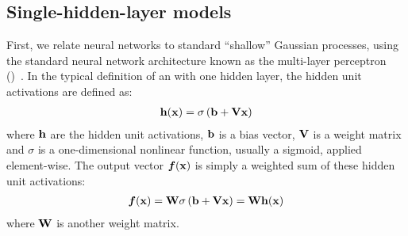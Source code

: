 \subsection{Single-hidden-layer models}

First, we relate neural networks to standard ``shallow'' Gaussian processes, using the standard neural network architecture known as the multi-layer perceptron (\MLP{})~\citep{rosenblatt1962principles}.
In the typical definition of an \MLP{} with one hidden layer, the hidden unit activations are defined as:
%
\begin{align}
{\bf{h}}({\bf{x}}) = \sigma \left( {\bf{b}} + \mathbf{V} {\bf{x}} \right)
\end{align}
%
where ${\bf{h}}$ are the hidden unit activations, ${\bf{b}}$ is a bias vector, $\mathbf{V}$ is a weight matrix and $\sigma$ is a one-dimensional nonlinear function, usually a sigmoid, applied element-wise. The output vector $\boldsymbol{f}({\bf{x}})$ is simply a weighted sum of these hidden unit activations:
%
\begin{align}
\boldsymbol{f}({\bf{x}}) = \mathbf{W} \sigma \left( {\bf{b}} + \mathbf{V} {\bf{x}} \right)  = \mathbf{W} {\bf{h}}({\bf{x}})
\label{eq:one-layer-nn}
\end{align}
%
where $\mathbf{W}$ is another weight matrix.

